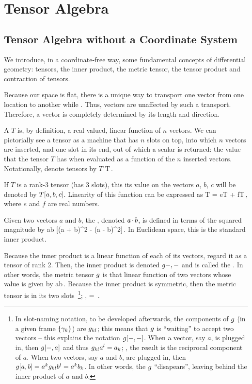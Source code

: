 \section{Tensor Algebra}

\subsection{Tensor Algebra without a Coordinate System}
We introduce, in a coordinate-free way, some fundamental concepts of differential geometry: tensors, the inner product, the metric tensor, the tensor product and contraction of tensors.

Because our space is flat, there is a unique way to transport one vector from one location to another while . Thus, vectors are unaffected by such a transport. Therefore, a vector is completely determined by its length and direction.

A  $T$ is, by definition, a real-valued, linear function of $n$ vectors. We can pictorially see a tensor as a machine that has $n$ slots on top, into which $n$ vectors are inserted, and one slot in its end, out of which a scalar is returned: the value that the tensor $T$ has when evaluated as a function of the $n$ inserted vectors. Notationally, denote tensors by $T$
\beq
T\vat{\slot,\slot,\slot,\slot}\qquad{}\,.
\eeq

If $T$ is a rank-3 tensor (has 3 slots), this its value on the vectors $a$, $b$, $c$ will be denoted by $T\!\left[{a,b,c}\right]$. Linearity of this function can be expressed as
\beq
T = eT + fT\,,
\eeq
where $e$ and $f$ are real numbers.

Given two vectors $a$ and $b$, the , denoted $a\operatorname{\cdot} b$, is defined in terms of the squared magnitude by
\beq
a\iprod b  {}[(a + b)^2 - (a - b)^2]\,.
\eeq
In Euclidean space, this is the standard inner product. 

Because the inner product is a linear function of each of its vectors, regard it as a tensor of rank 2. Then, the inner product is denoted $g{-,-}$ and is called the . In other words, the metric tensor $g$ is that linear function of two vectors whose value is given by
\beq
\metric{} a\iprod b\,.
\eeq
Because the inner product is symmetric, then the metric tensor is  in its two slots~\footnote{In slot-naming notation, to be developed afterwards, the components of $g$ (in a given frame $\left\lbrace{\gamma_{k}}\right\rbrace$) are $g_{{k}{l}}$; this means that $g$ is ``waiting'' to accept two vectors -- this explains the notation $g\!\left[{-,-}\right]$. When a vector, say $a$, is plugged in, then $g\!\left[{-, a}\right]$ and thus $g_{{k}{l}}{a}^{l} = {a}_{k}$; \ie, the result is the reciprocal component of $a$. When two vectors, say $a$ and $b$, are plugged in, then $g\!\left[{a,b}\right] = {a}^{k}g_{{k}{l}}{b}^{l} = {a}^{k}{b}_{k}$. In other words, the $g$ ``disapears'', leaving behind the inner product of $a$ and $b$.}; \ie,
\beq
\metric{} = \metric{}\,.
\eeq

